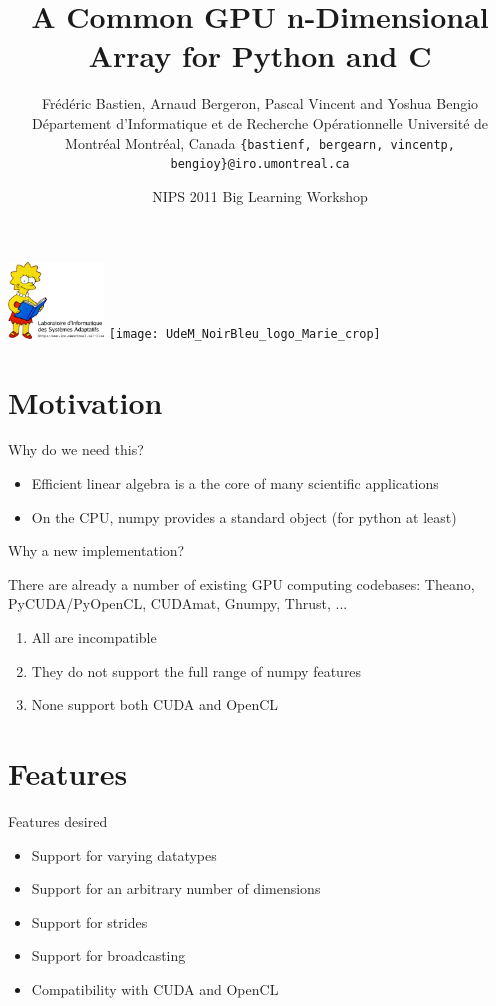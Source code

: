 \documentclass[utf8x,xcolor=pdftex,dvipsnames,table]{beamer}
\title{A Common GPU n-Dimensional Array for Python and C}
\author{
\footnotesize
Frédéric Bastien, Arnaud Bergeron, Pascal Vincent and Yoshua Bengio \newline
Département d'Informatique et de Recherche Opérationnelle \newline
Université de Montréal \newline
Montréal, Canada \newline
\texttt{\{bastienf, bergearn, vincentp, bengioy\}@iro.umontreal.ca}
}
\date{NIPS 2011 Big Learning Workshop}
\begin{document}
\begin{frame}[plain]
 \titlepage
 \includegraphics[width=1in]{lisabook_logo_text_3.png}
 \hfill
 \texttt{[image: UdeM\_NoirBleu\_logo\_Marie\_crop]}
\end{frame}

\setcounter{page}{1}

\section{Motivation}

\begin{frame}{Why do we need this?}
\begin{itemize}
\item Efficient linear algebra is a the core of many scientific applications
\item On the CPU, numpy provides a standard object (for python at least)
\end{itemize}
\end{frame}

\begin{frame}{Why a new implementation?}
\begin{block}{There are already a number of existing GPU computing codebases:}
Theano, PyCUDA/PyOpenCL, CUDAmat, Gnumpy, Thrust, ...
\end {block}
\begin{enumerate}
\item<2-> All are incompatible
\item<3-> They do not support the full range of numpy features
\item<4-> None support both CUDA and OpenCL
\end{enumerate}
\end{frame}

\section{Features}
\begin{frame}{Features desired}
\begin{itemize}
\item Support for varying datatypes
\item Support for an arbitrary number of dimensions
\item Support for strides
\item Support for broadcasting
\item Compatibility with CUDA and OpenCL
\end{itemize}
\end{frame}
\end{document}
